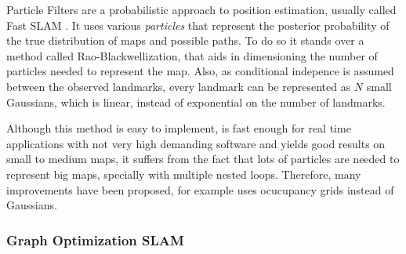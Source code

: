       Particle Filters are a probabilistic approach to position estimation, usually called Fast SLAM \cite{Montemerlo2002}. It uses various \textit{particles} that represent the posterior probability of the true distribution of maps and possible paths. To do so it stands over a method called Rao-Blackwellization, that aids in dimensioning the number of particles needed to represent the map. Also, as conditional indepence is assumed between the observed landmarks, every landmark can be represented as $N$ small Gaussians, which is linear, instead of exponential on the number of landmarks.

      Although this method is easy to implement, is fast enough for real time applications with not very high demanding software and yields good results on small to medium maps, it suffers from the fact that lots of particles are needed to represent big maps, specially with multiple nested loops. Therefore, many improvements have been proposed, \cite{Grisetti2007} for example uses ocucupancy grids instead of Gaussians.

    \subsubsection{Graph Optimization SLAM}



  \begin{comment}
    \begin{itemize}
    \end{itemize}
  \end{comment}
